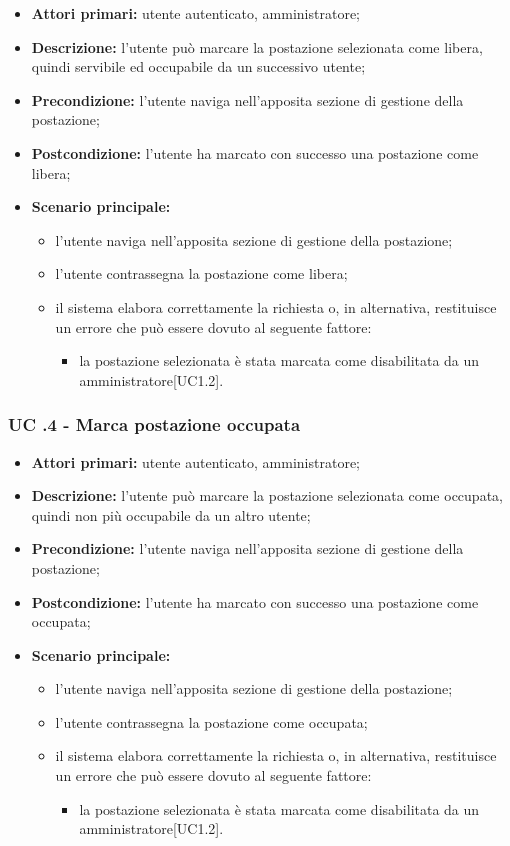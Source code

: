 \begin{itemize}
\item \textbf{Attori primari:} utente autenticato, amministratore;
\item \textbf{Descrizione:} l’utente può marcare la postazione selezionata come libera, quindi servibile ed occupabile da un successivo utente;
\item \textbf{Precondizione:} l’utente naviga nell’apposita sezione di gestione della postazione;
\item \textbf{Postcondizione:} l’utente ha marcato con successo una postazione come libera;
\item \textbf{Scenario principale:} 
	\begin{itemize}
		\item l’utente naviga nell’apposita sezione di gestione della postazione;
		\item l’utente contrassegna la postazione come libera;
		\item il sistema elabora correttamente la richiesta o, in alternativa, restituisce un errore che può essere dovuto al seguente fattore:
		\begin{itemize}
			\item la postazione selezionata è stata marcata come disabilitata da un amministratore[UC1.2].
		\end{itemize}
	\end{itemize}
\end{itemize}

\subsubsection{UC .4 - Marca postazione occupata}

\begin{itemize}
\item \textbf{Attori primari:} utente autenticato, amministratore;
\item \textbf{Descrizione:} l’utente può marcare la postazione selezionata come occupata, quindi non più occupabile da un altro utente;
\item \textbf{Precondizione:} l’utente naviga nell’apposita sezione di gestione della postazione;
\item \textbf{Postcondizione:} l’utente ha marcato con successo una postazione come occupata;
\item \textbf{Scenario principale:} 
	\begin{itemize}
		\item l’utente naviga nell’apposita sezione di gestione della postazione;
		\item l’utente contrassegna la postazione come occupata;
		\item il sistema elabora correttamente la richiesta o, in alternativa, restituisce un errore che può essere dovuto al seguente fattore:
		\begin{itemize}
			\item la postazione selezionata è stata marcata come disabilitata da un amministratore[UC1.2].
		\end{itemize}
	\end{itemize}
\end{itemize}

